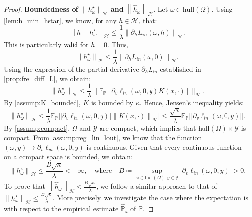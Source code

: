 \begin{proof}
\textbf{Boundedness of $\left\|h^\star_\omega\right\|_\mathcal{H}$ and $\left\|\hat{h}_\omega\right\|_\mathcal{H}$. }Let $\omega\in\text{hull}(\Omega)$. Using \cref{lem:h_min_hstar}, we know, for any $h\in\mathcal{H}$, that:
\begin{equation*}
    \left\|h-h^\star_\omega\right\|_\mathcal{H}\leq\frac{1}{\lambda}\left\|\partial_h L_{in}(\omega, h)\right\|_\mathcal{H}.
\end{equation*}
This is particularly valid for $h=0$. Thus,
\begin{equation*}
    \left\|h^\star_\omega\right\|_\mathcal{H}\leq\frac{1}{\lambda}\left\|\partial_h L_{in}(\omega, 0)\right\|_\mathcal{H}.
\end{equation*}
Using the expression of the partial derivative $\partial_{h}L_{in}$ established in \cref{prop:fre_diff_L}, we obtain:
\begin{equation*}
    \left\|h^\star_\omega\right\|_\mathcal{H}\leq\frac{1}{\lambda}\big\|\mathbb{E}_\mathbb{P}\left[\partial_v \ell_{in}(\omega, 0, y)K(x,\cdot)\right]\big\|_\mathcal{H}.
\end{equation*}
By \cref{assump:K_bounded}, $K$ is bounded by $\kappa$. Hence, Jensen's inequality yields:
\begin{equation*}
    \left\|h^\star_\omega\right\|_\mathcal{H}\leq\frac{1}{\lambda}\mathbb{E}_\mathbb{P}\Big[\left|\partial_v \ell_{in}(\omega, 0, y)\right|\left\|K(x,\cdot)\right\|_\mathcal{H}\Big]\leq\frac{\sqrt{\kappa}}{\lambda}\mathbb{E}_\mathbb{P}\Big[\left|\partial_v \ell_{in}(\omega, 0, y)\right|\Big].
\end{equation*}
By \cref{assump:compact}, $\Omega$ and $\mathcal{Y}$ are compact, which implies that $\text{hull}(\Omega)\times\mathcal{Y}$ is compact. From \cref{assump:reg_lin_lout}, we know that the function $(\omega, y)\mapsto\partial_v\ell_{in}(\omega, 0, y)$ is continuous. Given that every continuous function on a compact space is bounded, we obtain:
\begin{equation*}
    \left\|h^\star_\omega\right\|_\mathcal{H}\leq \frac{B\sqrt{\kappa}}{\lambda}<+\infty,\quad\text{where}\quad B\coloneqq\sup_{\omega\in\text{hull}(\Omega),y\in\mathcal{Y}}\left|\partial_v \ell_{in}(\omega, 0, y)\right|>0.
\end{equation*}
To prove that $\left\|\hat{h}_\omega\right\|_\mathcal{H}\leq\frac{B\sqrt{\kappa}}{\lambda}$, we follow a similar approach to that of $\left\|h^\star_\omega\right\|_\mathcal{H}\leq \frac{B\sqrt{\kappa}}{\lambda}$. More precisely, we investigate the case where the expectation is with respect to the empirical estimate $\hat{\mathbb{P}}_n$ of $\mathbb{P}$.


\end{proof}

